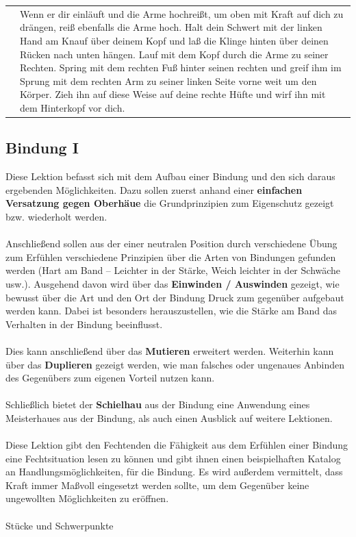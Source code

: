 \begin{longtable}{p{6.25cm}p{6.25cm}}
&
Wenn er dir einläuft und die Arme hochreißt, um oben mit Kraft auf dich zu drängen, reiß ebenfalls die Arme hoch. Halt dein Schwert mit der linken Hand am Knauf über deinem Kopf und laß die Klinge hinten über deinen Rücken nach unten hängen. Lauf mit dem Kopf durch die Arme zu seiner Rechten. Spring mit dem rechten Fuß hinter seinen rechten und greif ihm im Sprung mit dem rechten Arm zu seiner linken Seite vorne weit um den Körper. Zieh ihn auf diese Weise auf deine rechte Hüfte und wirf ihn mit dem Hinterkopf vor dich.
\end{longtable}

\newpage

\begin{center}
\end{center}

\newpage

\subsection{Bindung I}\label{Bindung1}

\begin{center}
\end{center}
Diese Lektion befasst sich mit dem Aufbau einer Bindung und den sich daraus ergebenden Möglichkeiten. Dazu sollen zuerst anhand einer \textbf{einfachen Versatzung gegen Oberhäue} die Grundprinzipien zum Eigenschutz gezeigt bzw. wiederholt werden.
\\
\\
Anschließend sollen aus der einer neutralen Position durch verschiedene Übung zum Erfühlen verschiedene Prinzipien über die Arten von Bindungen gefunden werden (Hart am Band – Leichter in der Stärke, Weich leichter in der Schwäche usw.). Ausgehend davon wird über das \textbf{Einwinden / Auswinden} gezeigt, wie bewusst über die Art und den Ort der Bindung Druck zum gegenüber aufgebaut werden kann. Dabei ist besonders herauszustellen, wie die Stärke am Band das Verhalten in der Bindung beeinflusst.
\\
\\
Dies kann anschließend über das \textbf{Mutieren} erweitert werden. Weiterhin kann über das \textbf{Duplieren} gezeigt werden, wie man falsches oder ungenaues Anbinden des Gegenübers zum eigenen Vorteil nutzen kann.
\\
\\
Schließlich bietet der \textbf{Schielhau} aus der Bindung eine Anwendung eines Meisterhaues aus der Bindung, als auch einen Ausblick auf weitere Lektionen.
\\
\\
Diese Lektion gibt den Fechtenden die Fähigkeit aus dem Erfühlen einer Bindung eine Fechtsituation lesen zu können und gibt ihnen einen beispielhaften Katalog an Handlungsmöglichkeiten, für die Bindung. Es wird außerdem vermittelt, dass Kraft immer Maßvoll eingesetzt werden sollte, um dem Gegenüber keine ungewollten Möglichkeiten zu eröffnen.
\\
\\
Stücke und Schwerpunkte

